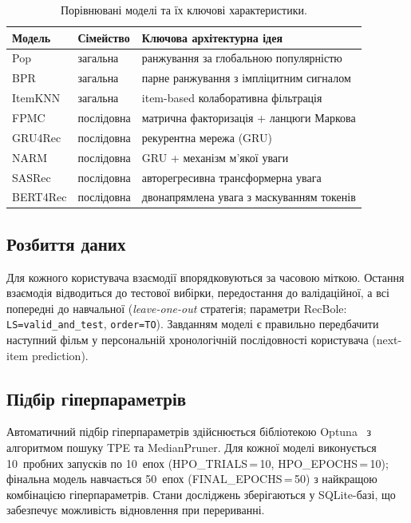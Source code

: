 \documentclass[12pt,a4paper]{article}
\begin{document}
\begin{table}[h!]
\centering
\caption{Порівнювані моделі та їх ключові характеристики.}
\label{tab:models}
\begin{tabular}{llp{7.5cm}}
\toprule
Модель   & Сімейство  & Ключова архітектурна ідея \\
\midrule
Pop      & загальна   & ранжування за глобальною популярністю \\
BPR      & загальна   & парне ранжування з імпліцитним сигналом \\
ItemKNN  & загальна   & item-based колаборативна фільтрація \\
\midrule
FPMC     & послідовна & матрична факторизація + ланцюги Маркова \\
GRU4Rec  & послідовна & рекурентна мережа (GRU) \\
NARM     & послідовна & GRU + механізм м'якої уваги \\
SASRec   & послідовна & авторегресивна трансформерна увага \\
BERT4Rec & послідовна & двонапрямлена увага з маскуванням токенів \\
\bottomrule
\end{tabular}
\end{table}

\subsection{Розбиття даних}

Для кожного користувача взаємодії впорядковуються за часовою міткою.
Остання взаємодія відводиться до тестової вибірки, передостання
до валідаційної, а всі попередні до навчальної
(\textit{leave-one-out} стратегія; параметри RecBole:
\texttt{LS=valid\_and\_test}, \texttt{order=TO}).
Завданням моделі є правильно передбачити наступний фільм у персональній
хронологічній послідовності користувача (next-item prediction).

\subsection{Підбір гіперпараметрів}

Автоматичний підбір гіперпараметрів здійснюється бібліотекою
Optuna~\cite{akiba2019optuna} з алгоритмом пошуку TPE та MedianPruner.
Для кожної моделі виконується 10~пробних запусків по 10~епох
(HPO\_TRIALS\,=\,10, HPO\_EPOCHS\,=\,10); фінальна модель навчається
50~епох (FINAL\_EPOCHS\,=\,50) з найкращою комбінацією гіперпараметрів.
Стани досліджень зберігаються у SQLite-базі, що забезпечує можливість
відновлення при перериванні.
\end{document}

